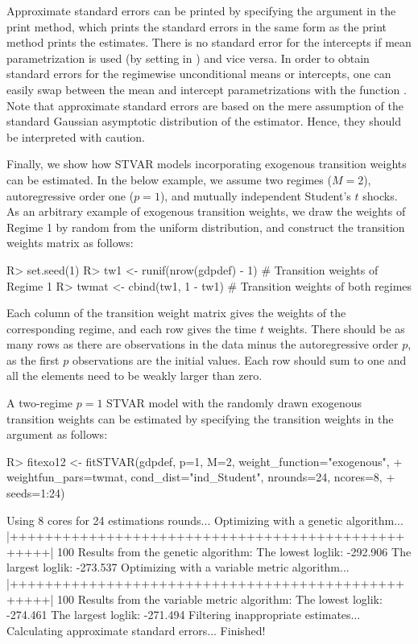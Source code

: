 \documentclass[nojss]{jss}
\begin{document}
Approximate standard errors can be printed by specifying the argument  in the print method, which prints the standard errors in the same form as the print method prints the estimates. There is no standard error for the intercepts if mean parametrization is used (by setting  in ) and vice versa. In order to obtain standard errors for the regimewise unconditional means or intercepts, one can easily swap between the mean and intercept parametrizations with the function . Note that approximate standard errors are based on the mere assumption of the standard Gaussian asymptotic distribution of the estimator. Hence, they should be interpreted with caution.

Finally, we show how STVAR models incorporating exogenous transition weights can be estimated. In the below example, we assume two regimes ($M=2$), autoregressive order one ($p=1$), and mutually independent Student's $t$ shocks. As an arbitrary example of exogenous transition weights, we draw the weights of Regime 1 by random from the uniform distribution, and construct the transition weights matrix as follows:
\begin{CodeChunk}
\begin{CodeInput}
R> set.seed(1)
R> tw1 <- runif(nrow(gdpdef) - 1) # Transition weights of Regime 1
R> twmat <- cbind(tw1, 1 - tw1) # Transition weights of both regimes
\end{CodeInput}
\end{CodeChunk}
Each column of the transition weight matrix gives the weights of the corresponding regime, and each row gives the time $t$ weights. There should be as many rows as there are observations in the data minus the autoregressive order $p$, as the first $p$ observations are the initial values. Each row should sum to one and all the elements need to be weakly larger than zero.

A two-regime $p=1$ STVAR model with the randomly drawn exogenous transition weights can be estimated by specifying the transition weights in the argument  as follows:
\begin{CodeChunk}
\begin{CodeInput}
R> fitexo12 <- fitSTVAR(gdpdef, p=1, M=2, weight_function="exogenous",
+    weightfun_pars=twmat, cond_dist="ind_Student", nrounds=24, ncores=8,
+    seeds=1:24)
\end{CodeInput}
\begin{CodeOutput}
Using 8 cores for 24 estimations rounds...
Optimizing with a genetic algorithm...
  |++++++++++++++++++++++++++++++++++++++++++++++++++| 100%
Results from the genetic algorithm:
The lowest loglik:  -292.906
The largest loglik: -273.537
Optimizing with a variable metric algorithm...
  |++++++++++++++++++++++++++++++++++++++++++++++++++| 100%
Results from the variable metric algorithm:
The lowest loglik:  -274.461
The largest loglik: -271.494
Filtering inappropriate estimates...
Calculating approximate standard errors...
Finished!
\end{CodeOutput}
\end{CodeChunk}
\end{document}
